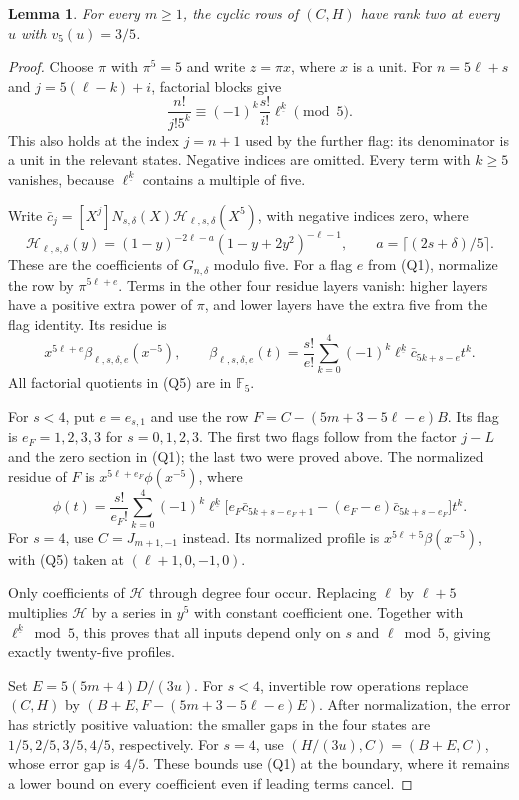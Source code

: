 \documentclass[11pt]{article}
\newtheorem{lemma}[theorem]{Lemma}
\begin{document}
\begin{lemma}\label{lem:quintic-five-adic-boundary}
For every $m\ge1$, the cyclic rows of $(C,H)$ have rank two
at every $u$ with $v_5(u)=3/5$.
\end{lemma}
\begin{proof}
Choose $\pi$ with $\pi^5=5$ and write $z=\pi x$, where $x$ is
a unit. For $n=5\ell+s$ and $j=5(\ell-k)+i$, factorial blocks give
\[
 \frac{n!}{j!5^k}\equiv
       (-1)^k\frac{s!}{i!}\ell^{\underline k}\pmod5.       \tag{Q4}
\]
This also holds at the index $j=n+1$ used by the further flag:
its denominator is a unit in the relevant states.
Negative indices are omitted.
Every term with $k\ge5$ vanishes, because
$\ell^{\underline k}$ contains a multiple of five.

Write $\bar c_j=[X^j]N_{s,\delta}(X)
\mathcal H_{\ell,s,\delta}(X^5)$, with negative indices zero, where
\[
 \mathcal H_{\ell,s,\delta}(y)
 =(1-y)^{-2\ell-a}(1-y+2y^2)^{-\ell-1},\qquad
 a=\lceil(2s+\delta)/5\rceil.
\]
These are the coefficients of $G_{n,\delta}$ modulo five.
For a flag $e$ from (Q1), normalize the row by
$\pi^{5\ell+e}$. Terms in the other four residue layers vanish:
higher layers have a positive extra power of $\pi$, and lower
layers have the extra five from the flag identity.
Its residue is
\[
 x^{5\ell+e}\beta_{\ell,s,\delta,e}(x^{-5}),\qquad
 \beta_{\ell,s,\delta,e}(t)
 =\frac{s!}{e!}\sum_{k=0}^4
        (-1)^k\ell^{\underline k}\bar c_{5k+s-e}t^k.      \tag{Q5}
\]
All factorial quotients in (Q5) are in $\mathbb F_5$.

For $s<4$, put $e=e_{s,1}$ and use the row
$F=C-(5m+3-5\ell-e)B$.
Its flag is $e_F=1,2,3,3$ for $s=0,1,2,3$.
The first two flags follow from the factor $j-L$ and the zero
section in (Q1); the last two were proved above.
The normalized residue of $F$ is $x^{5\ell+e_F}\phi(x^{-5})$,
where
\[
 \phi(t)=\frac{s!}{e_F!}\sum_{k=0}^4(-1)^k\ell^{\underline k}
 \bigl[e_F\bar c_{5k+s-e_F+1}
       -(e_F-e)\bar c_{5k+s-e_F}\bigr]t^k.               \tag{Q6}
\]
For $s=4$, use $C=J_{m+1,-1}$ instead.
Its normalized profile is $x^{5\ell+5}\beta(x^{-5})$,
with (Q5) taken at $(\ell+1,0,-1,0)$.

Only coefficients of $\mathcal H$ through degree four occur.
Replacing $\ell$ by $\ell+5$ multiplies $\mathcal H$ by a series
in $y^5$ with constant coefficient one.
Together with $\ell^{\underline k}\bmod5$, this proves that all
inputs depend only on $s$ and $\ell\bmod5$, giving exactly
twenty-five profiles.

Set $E=5(5m+4)D/(3u)$.
For $s<4$, invertible row operations replace $(C,H)$ by
$(B+E,F-(5m+3-5\ell-e)E)$.
After normalization, the error has strictly positive valuation:
the smaller gaps in the four states are
$1/5,2/5,3/5,4/5$, respectively.
For $s=4$, use $(H/(3u),C)=(B+E,C)$, whose error gap is $4/5$.
These bounds use (Q1) at the boundary, where it remains a
lower bound on every coefficient even if leading terms cancel.


\end{proof}
\end{document}

